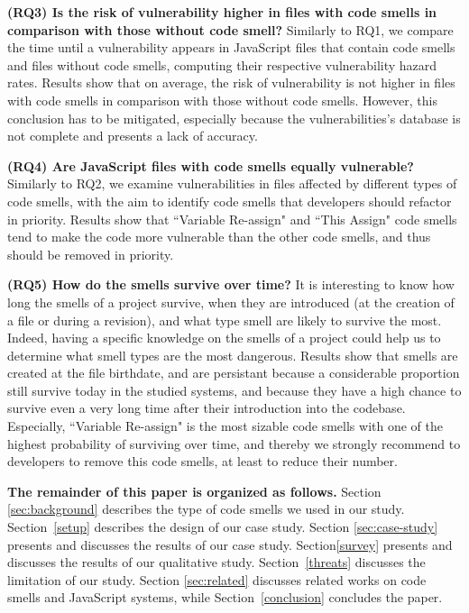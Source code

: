 {\color{blue}\textbf{(RQ3) Is the risk of vulnerability higher in files with code smells in comparison with those without code smell?}
Similarly to RQ1, we compare the time until a vulnerability appears in JavaScript files that contain code smells and files without code smells, computing their respective vulnerability hazard rates. Results show that on average, the risk of vulnerability is not higher in files with code smells in comparison with those without code smells. However, this conclusion has to be mitigated, especially because the vulnerabilities's database is not complete and presents a lack of accuracy.

\textbf{(RQ4) Are JavaScript files with code smells equally vulnerable?}
Similarly to RQ2, we examine vulnerabilities in files affected by different types of code smells, with the aim to identify code smells that developers should refactor in priority. Results show that ``Variable Re-assign" and ``This Assign" code smells tend to make the code more vulnerable than the other code smells, and thus should be removed in priority.

\textbf{(RQ5) How do the smells survive over time?}
It is interesting to know how long the smells of a project survive, when they are introduced (at the creation of a file or during a revision), and what type smell are likely to survive the most. Indeed, having a specific knowledge on the smells of a project could help us to determine what smell types are the most dangerous. Results show that smells are created at the file birthdate, and are persistant because a considerable proportion still survive today in the studied systems, and because they have a high chance to survive even a very long time after their introduction into the codebase. Especially, ``Variable Re-assign" is the most sizable code smells with one of the highest probability of surviving over time, and thereby we strongly recommend to developers to remove this code smells, at least to reduce their number. 
}

\textbf{The remainder of this paper is organized as follows.} Section \ref{sec:background} describes the type of code smells we used in our study.
Section~\ref{setup} describes the design of our case study. Section \ref{sec:case-study} presents and discusses the results of our case study. Section\ref{survey} presents and discusses the results of our qualitative study. Section~\ref{threats} discusses the limitation of our study. Section \ref{sec:related} discusses related works on code smells and JavaScript systems, while Section~\ref{conclusion} concludes the paper. 